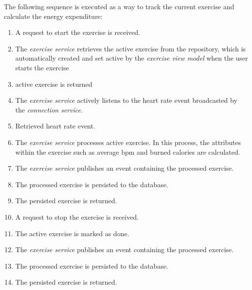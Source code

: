 The following sequence is executed as a way to track the current exercise and calculate the energy expenditure:
\begin{enumerate}
    \item A request to start the exercise is received.
    \item The \emph{exercise service} retrieves the active exercise from the repository, which is automatically created and set active by the \emph{exercise view model} when the user starts the exercise
    \item active exercise is returned
    \item The \emph{exercise service} actively listens to the heart rate event broadcasted by the \emph{connection service}.
    \item Retrieved heart rate event.
    \item The \emph{exercise service} processes active exercise. In this process, the attributes within the exercise such as average bpm and burned calories are calculated.
    \item The \emph{exercise service} publishes an event containing the processed exercise.
    \item The processed exercise is persisted to the database.
    \item The persisted exercise is returned.
    \item A request to stop the exercise is received.
    \item The active exercise is marked as done.
    \item The \emph{exercise service} publishes an event containing the processed exercise.
    \item The processed exercise is persisted to the database.
    \item The persisted exercise is returned.
\end{enumerate}

